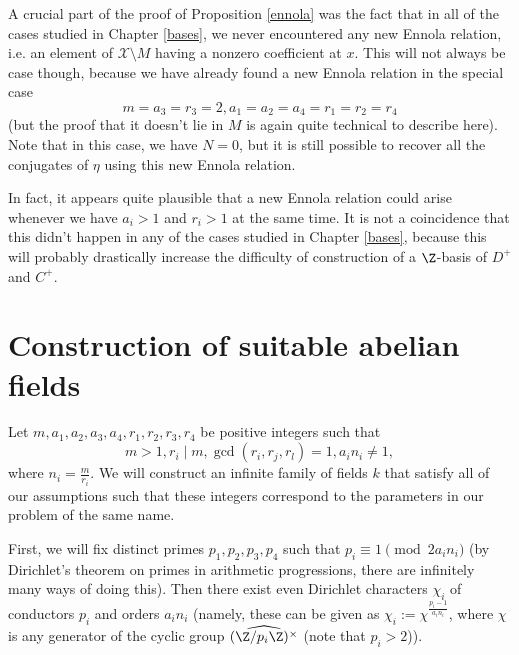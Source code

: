 \begin{rem}
A crucial part of the proof of Proposition \ref{ennola} was the fact that in all of the cases studied in Chapter \ref{bases}, we never encountered any new Ennola relation, i.e. an element of $\mathcal{X}\setminus M$ having a nonzero coefficient at $x$. This will not always be case though, because we have already found a new Ennola relation in the special case $$m=a_3=r_3=2, a_1=a_2=a_4=r_1=r_2=r_4$$ (but the proof that it doesn't lie in $M$ is again quite technical to describe here). Note that in this case, we have $N=0$, but it is still possible to recover all the conjugates of $\eta$ using this new Ennola relation.

In fact, it appears quite plausible that a new Ennola relation could arise whenever we have $a_i>1$ and $r_i>1$ at the same time. It is not a coincidence that this didn't happen in any of the cases studied in Chapter \ref{bases}, because this will probably drastically increase the difficulty of construction of a $\Z$-basis of $D^+$ and $C^+$.
\end{rem}

\iffalse
\section{Construction of suitable abelian fields}
Let $m,a_1,a_2,a_3,a_4,r_1,r_2,r_3,r_4$ be positive integers such that 
$$m>1, r_i\mid m, \gcd(r_i,r_j,r_l)=1, a_in_i\neq 1,$$
where $n_i=\frac{m}{r_i}$.
We will construct an infinite family of fields $k$ that satisfy all of our assumptions such that these integers correspond to the parameters in our problem of the same name.

First, we will fix distinct primes $p_1,p_2,p_3,p_4$ such that $p_i\equiv 1\pmod{ 2a_in_i}$ (by Dirichlet's theorem on primes in arithmetic progressions, there are infinitely many ways of doing this). Then there exist even Dirichlet characters $\chi_i$ of conductors $p_i$ and orders $a_in_i$ (namely, these can be given as $\chi_i:=\chi^{\frac{p_i-1}{a_in_i}}$, where $\chi$ is any generator of the cyclic group $\widehat{(\Z/p_i\Z)^\times}$ (note that $p_i>2$)).

